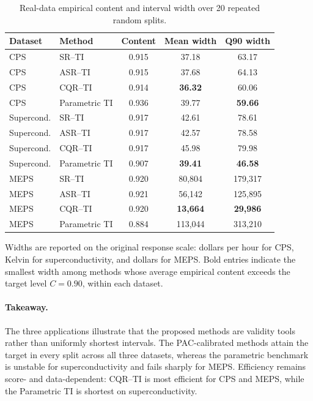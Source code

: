 \begin{table}[H]
\centering
\caption{Real-data empirical content and interval width over 20 repeated random
splits.}
\label{tab:real-data-summary}
\small
\begin{tabular}{llccc}
\toprule
Dataset & Method & Content & Mean width & Q90 width \\
\midrule
CPS & SR--TI          & 0.915 & 37.18 & 63.17 \\
CPS & ASR--TI         & 0.915 & 37.68 & 64.13 \\
CPS & CQR--TI         & 0.914 & \textbf{36.32} & 60.06 \\
CPS & Parametric TI   & 0.936 & 39.77 & \textbf{59.66} \\
\midrule
Supercond. & SR--TI        & 0.917 & 42.61 & 78.61 \\
Supercond. & ASR--TI       & 0.917 & 42.57 & 78.58 \\
Supercond. & CQR--TI       & 0.917 & 45.98 & 79.98 \\
Supercond. & Parametric TI & 0.907 & \textbf{39.41} & \textbf{46.58} \\
\midrule
MEPS & SR--TI        & 0.920 & 80{,}804 & 179{,}317 \\
MEPS & ASR--TI       & 0.921 & 56{,}142 & 125{,}895 \\
MEPS & CQR--TI       & 0.920 & \textbf{13{,}664} & \textbf{29{,}986} \\
MEPS & Parametric TI & 0.884 & 113{,}044 & 313{,}210 \\
\bottomrule
\end{tabular}

\vspace{0.25em}
\begin{flushleft}
\footnotesize
Widths are reported on the original response scale: dollars per hour for CPS,
Kelvin for superconductivity, and dollars for MEPS. Bold entries indicate the
smallest width among methods whose average empirical content exceeds the target
level \(C=0.90\), within each dataset.
\end{flushleft}
\end{table}

\paragraph{Takeaway.}
The three applications illustrate that the proposed methods are validity tools
rather than uniformly shortest intervals. The PAC-calibrated methods attain the
target in every split across all three datasets, whereas the parametric
benchmark is unstable for superconductivity and fails sharply for MEPS.
Efficiency remains score- and data-dependent: CQR--TI is most efficient for CPS
and MEPS, while the Parametric TI is shortest on superconductivity.
